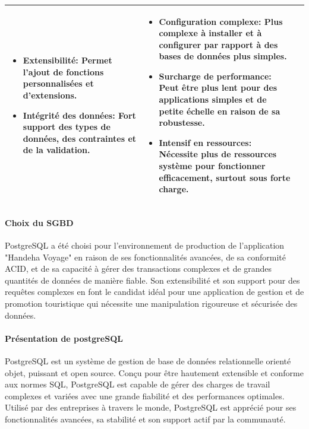 \documentclass[12pt]{report}
\begin{document}
\begin{longtable}{|p{3cm}|p{5.5cm}|p{5.5cm}|}
\begin{itemize}
							\item \textbf{Extensibilité:} Permet l'ajout de fonctions personnalisées et d'extensions.
							\item \textbf{Intégrité des données:} Fort support des types de données, des contraintes et de la validation.
						\end{itemize} &
						\begin{itemize}
							\item \textbf{Configuration complexe:} Plus complexe à installer et à configurer par rapport à des bases de données plus simples.
							\item \textbf{Surcharge de performance:} Peut être plus lent pour des applications simples et de petite échelle en raison de sa robustesse.
							\item \textbf{Intensif en ressources:} Nécessite plus de ressources système pour fonctionner efficacement, surtout sous forte charge.
						\end{itemize} \\
						\hline
				    \end{longtable}

				\paragraph{Choix du SGBD} 
				
				 PostgreSQL a été choisi pour l'environnement de production de l'application "Handeha Voyage" en raison de ses fonctionnalités avancées, de sa conformité ACID, et de sa capacité à gérer des transactions complexes et de grandes quantités de données de manière fiable. Son extensibilité et son support pour des requêtes complexes en font le candidat idéal pour une application de gestion et de promotion touristique qui nécessite une manipulation rigoureuse et sécurisée des données.

				\paragraph{Présentation de postgreSQL}

				PostgreSQL est un système de gestion de base de données relationnelle orienté objet, puissant et open source. Conçu pour être hautement extensible et conforme aux normes SQL, PostgreSQL est capable de gérer des charges de travail complexes et variées avec une grande fiabilité et des performances optimales. Utilisé par des entreprises à travers le monde, PostgreSQL est apprécié pour ses fonctionnalités avancées, sa stabilité et son support actif par la communauté.
\end{document}
